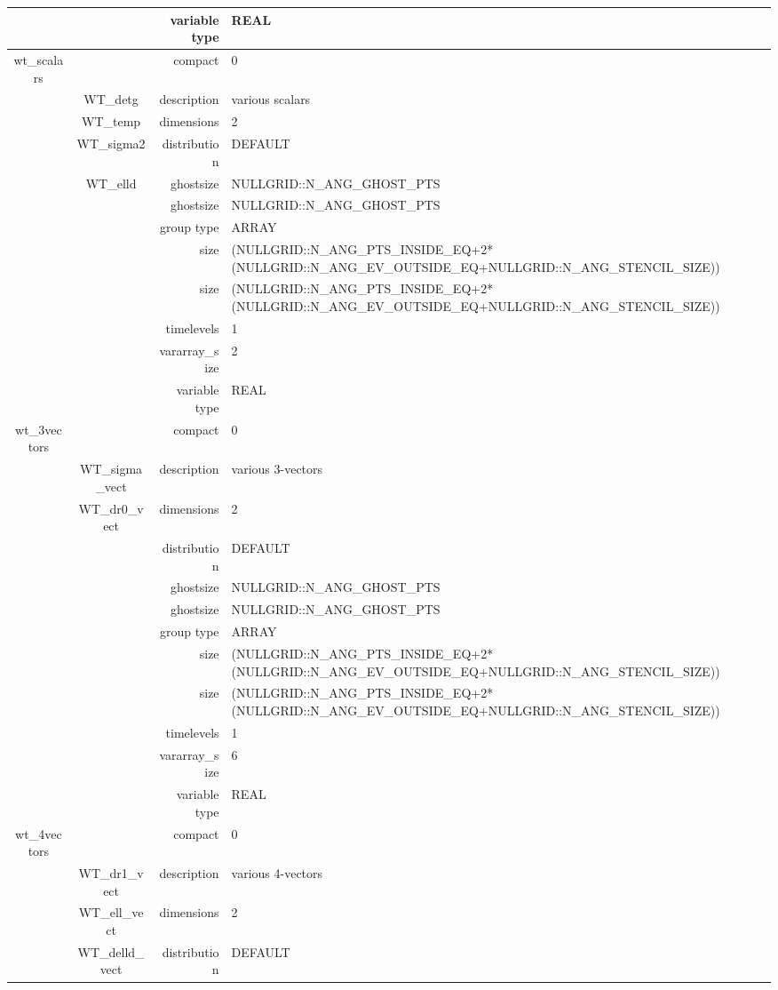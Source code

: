 \begin{tabular*}{150mm}{|c|c@{\extracolsep{\fill}}|rl|}
 &  & variable type & REAL \\ 
\hline 
wt\_scalars &  & compact & 0 \\ 
 & WT\_detg & description & various scalars \\ 
 & WT\_temp & dimensions & 2 \\ 
 & WT\_sigma2 & distribution & DEFAULT \\ 
 & WT\_elld & ghostsize & NULLGRID::N\_ANG\_GHOST\_PTS \\ 
& ~ & ghostsize & NULLGRID::N\_ANG\_GHOST\_PTS \\ 
 &  & group type & ARRAY \\ 
 &  & size & (NULLGRID::N\_ANG\_PTS\_INSIDE\_EQ+2*(NULLGRID::N\_ANG\_EV\_OUTSIDE\_EQ+NULLGRID::N\_ANG\_STENCIL\_SIZE)) \\ 
& ~ & size & (NULLGRID::N\_ANG\_PTS\_INSIDE\_EQ+2*(NULLGRID::N\_ANG\_EV\_OUTSIDE\_EQ+NULLGRID::N\_ANG\_STENCIL\_SIZE)) \\ 
 &  & timelevels & 1 \\ 
 &  & vararray\_size & 2 \\ 
 &  & variable type & REAL \\ 
\hline 
wt\_3vectors &  & compact & 0 \\ 
 & WT\_sigma\_vect & description & various 3-vectors \\ 
 & WT\_dr0\_vect & dimensions & 2 \\ 
 &  & distribution & DEFAULT \\ 
 &  & ghostsize & NULLGRID::N\_ANG\_GHOST\_PTS \\ 
& ~ & ghostsize & NULLGRID::N\_ANG\_GHOST\_PTS \\ 
 &  & group type & ARRAY \\ 
 &  & size & (NULLGRID::N\_ANG\_PTS\_INSIDE\_EQ+2*(NULLGRID::N\_ANG\_EV\_OUTSIDE\_EQ+NULLGRID::N\_ANG\_STENCIL\_SIZE)) \\ 
& ~ & size & (NULLGRID::N\_ANG\_PTS\_INSIDE\_EQ+2*(NULLGRID::N\_ANG\_EV\_OUTSIDE\_EQ+NULLGRID::N\_ANG\_STENCIL\_SIZE)) \\ 
 &  & timelevels & 1 \\ 
 &  & vararray\_size & 6 \\ 
 &  & variable type & REAL \\ 
\hline 
wt\_4vectors &  & compact & 0 \\ 
 & WT\_dr1\_vect & description & various 4-vectors \\ 
 & WT\_ell\_vect & dimensions & 2 \\ 
 & WT\_delld\_vect & distribution & DEFAULT \\ 

\end{tabular*}
